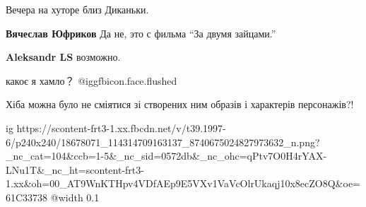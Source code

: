  
 
 
 
 
Вечера на хуторе близ Диканьки.

\textbf{Вячеслав Юфриков} Да не, это с фильма \enquote{За двумя зайцами.}

\textbf{Aleksandr LS} возможно.

какоє я хамло？ @igg{fbicon.face.flushed} 

Хіба можна було не сміятися зі створених ним образів і характерів персонажів?!

\ifcmt
  ig https://scontent-frt3-1.xx.fbcdn.net/v/t39.1997-6/p240x240/18678071_114314709163137_8740675024827973632_n.png?_nc_cat=104&ccb=1-5&_nc_sid=0572db&_nc_ohc=qPtv7O0H4rYAX-LNu1T&_nc_ht=scontent-frt3-1.xx&oh=00_AT9WnKTHpv4VDfAEp9E5VXv1VaVcOlrUkaqj10x8ecZO8Q&oe=61C33738
  @width 0.1
\fi
